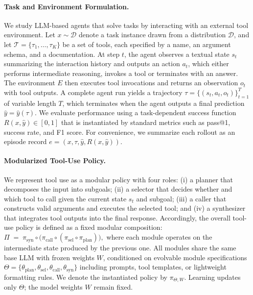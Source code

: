 \documentclass[11pt]{article}
\begin{document}
\paragraph{Task and Environment Formulation.}
We study LLM-based agents that solve tasks by interacting with an external tool environment. Let $x \sim \mathcal{D}$ denote a task instance drawn from a distribution $\mathcal{D}$, and let $\mathcal{T}=\{\tau_1,\dots,\tau_K\}$ be a set of tools, each specified by a name, an argument schema, and a documentation. At step $t$, the agent observes a textual state $s_t$ summarizing the interaction history and outputs an action $a_t$, which either performs intermediate reasoning, invokes a tool or terminates with an answer. The environment $E$ then executes tool invocations and returns an observation $o_t$ with tool outputs. A complete agent run yields a trajectory $\tau=\{(s_t,a_t,o_t)\}_{t=1}^{T}$ of variable length $T$, which terminates when the agent outputs a final prediction $\hat{y}=\hat{y}(\tau)$. We evaluate performance using a task-dependent success function $R(x,\hat{y}) \in [0,1]$ that is instantiated by standard metrics such as pass@1, success rate, and F1 score. For convenience, we summarize each rollout as an episode record $e=(x,\tau,\hat{y}, R(x,\hat{y}))$. 




\paragraph{Modularized Tool-Use Policy.}
We represent tool use as a modular policy with four roles: (i) a planner that decomposes the input into subgoals; (ii) a selector that decides whether and which tool to call given the current state $s_t$ and subgoal; (iii) a caller that constructs valid arguments and executes the selected tool; and (iv) a synthesizer that integrates tool outputs into the final response. Accordingly, the overall tool-use policy is defined as a fixed modular composition:
$
\Pi \;=\; \pi_{\text{syn}} \circ \big(\pi_{\text{call}} \circ (\pi_{\text{sel}} \circ \pi_{\text{plan}})\big),
$ where each module operates on the intermediate state produced by the previous one.
All modules share the same base LLM with frozen weights $W$, conditioned on evolvable module specifications $\Theta=\{\theta_{\text{plan}},\theta_{\text{sel}},\theta_{\text{call}},\theta_{\text{syn}}\}$ including prompts, tool templates, or lightweight formatting rules. We denote the instantiated policy by $\pi_{\Theta,W}$. Learning updates only $\Theta$; the model weights $W$ remain fixed.
\end{document}
